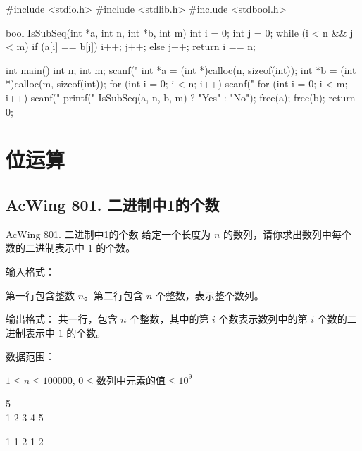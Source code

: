 \begin{mycpptwocol}[判断子序列]
    #include <stdio.h>
    #include <stdlib.h>
    #include <stdbool.h>

    bool IsSubSeq(int *a, int n, int *b, int m)
        {
        int i = 0;
        int j = 0;
        while (i < n && j < m) {
            if (a[i] == b[j]) {
                i++;
                j++;
            } else {
                j++;
            }
        }
        return i == n;
    }

    int main()
        {
        int n;
        int m;
        scanf("%
        int *a = (int *)calloc(n, sizeof(int));
        int *b = (int *)calloc(m, sizeof(int));
        for (int i = 0; i < n; i++) {
            scanf("%
        }
        for (int i = 0; i < m; i++) {
            scanf("%
        }
        printf("%
        IsSubSeq(a, n, b, m) ? "Yes" : "No");
        free(a);
        free(b);
        return 0;
    }
\end{mycpptwocol}


\section{位运算}

\subsection{AcWing 801. 二进制中1的个数}
\begin{titledbox}{AcWing 801. 二进制中1的个数}
    给定一个长度为 $n$ 的数列，请你求出数列中每个数的二进制表示中 $1$ 的个数。

    输入格式：

    第一行包含整数 $n$。第二行包含 $n$ 个整数，表示整个数列。

    输出格式：
    共一行，包含 $n$ 个整数，其中的第 $i$ 个数表示数列中的第 $i$ 个数的二进制表示中 $1$ 的个数。

    数据范围：

    $1 \le n \le 100000$, $0 \le \text{数列中元素的值} \le 10^9$

    \begin{inputblock}
        5 \\
        1 2 3 4 5
    \end{inputblock}
    \begin{outputblock}
        1 1 2 1 2
    \end{outputblock}
\end{titledbox}

